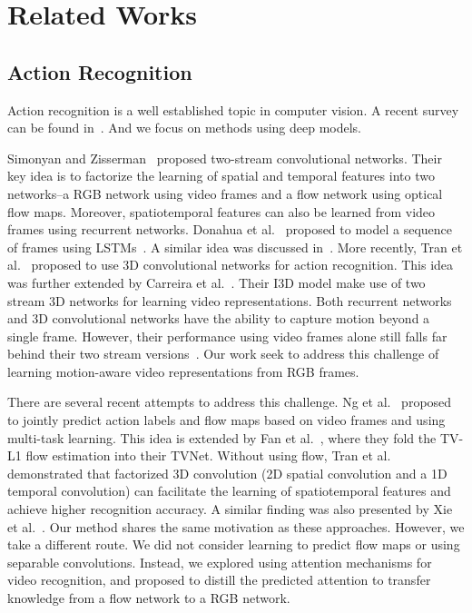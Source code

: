 \documentclass[10pt,twocolumn,letterpaper]{article}
\begin{document}
\section{Related Works}

\subsection{Action Recognition}
Action recognition is a well established topic in computer vision. A recent survey can be found in~\cite{poppe2010survey}. And we focus on methods using deep models. 

Simonyan and Zisserman~\cite{simonyan2014two} proposed two-stream convolutional networks. Their key idea is to factorize the learning of spatial and temporal features into two networks--a RGB network using video frames and a flow network using optical flow maps. Moreover, spatiotemporal features can also be learned from video frames using recurrent networks. Donahua et al.\ \cite{donahue2015long} proposed to model a sequence of frames using LSTMs~\cite{hochreiter1997long}. A similar idea was discussed in~\cite{yue2015beyond}. More recently, Tran et al.\ \cite{tran2015learning} proposed to use 3D convolutional networks for action recognition. This idea was further extended by Carreira et al.\ \cite{carreira2017quo}. Their I3D model make use of two stream 3D networks for learning video representations. Both recurrent networks and 3D convolutional networks have the ability to capture motion beyond a single frame. However, their performance using video frames alone still falls far behind their two stream versions~\cite{yue2015beyond,carreira2017quo}. Our work seek to address this challenge of learning motion-aware video representations from RGB frames.  

There are several recent attempts to address this challenge. Ng et al.\ \cite{ng2016actionflownet} proposed to jointly predict action labels and flow maps based on video frames and using multi-task learning. This idea is extended by Fan et al.\ \cite{fan2018end}, where they fold the TV-L1 flow estimation into their TVNet. Without using flow, Tran et al.\ \cite{Tran_2018_CVPR} demonstrated that factorized 3D convolution (2D spatial convolution and a 1D temporal convolution) can facilitate the learning of spatiotemporal features and achieve higher recognition accuracy. A similar finding was also presented by Xie et al.\ \cite{Xie_2018_ECCV}. Our method shares the same motivation as these approaches. However, we take a different route. We did not consider learning to predict flow maps or using separable convolutions. Instead, we explored using attention mechanisms for video recognition, and proposed to distill the predicted attention to transfer knowledge from a flow network to a RGB network.
\end{document}
